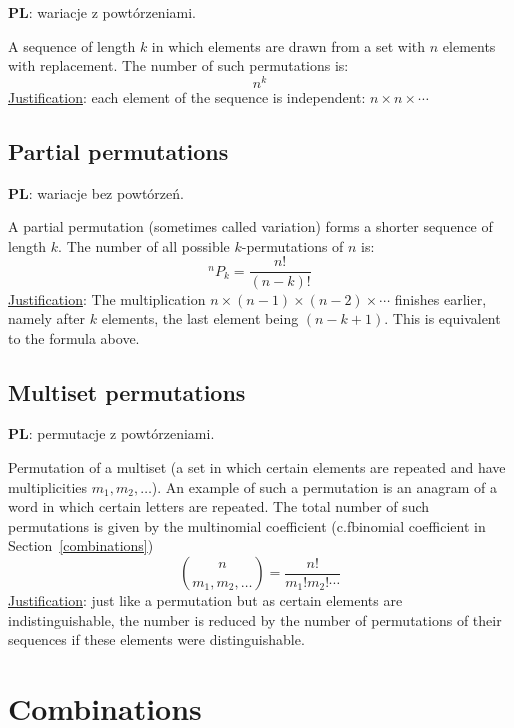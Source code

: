 \documentclass{article}
\makeatletter
\newcommand*{\cf}{c.f\@ifnextchar{.}{}{.\@\xspace}}
\newcommand{\pl}{\textbf{PL}: }
\makeatother
\begin{document}
\foreignlanguage{polish}{\pl wariacje z powtórzeniami.}

A sequence of length $k$ in which elements are drawn from a set with $n$ elements with replacement.
The number of such permutations is:
\begin{equation}
    n^k
\end{equation}
\underline{Justification}: each element of the sequence is independent: $n\times n\times \dotsb$

\subsection{Partial permutations}

\foreignlanguage{polish}{\pl wariacje bez powtórzeń.}

A partial permutation (sometimes called variation) forms a shorter sequence of length $k$. 
The number of all possible $k$\nobreakdash-\hspace{0pt}permutations of $n$ is:
\begin{equation}
    ^nP_k = \frac{n!}{(n-k)!}
\end{equation}
\underline{Justification}: The multiplication ${n\times(n-1)\times(n-2)\times \dotsb}$  finishes earlier, namely after $k$ elements, the last element being $(n-k+1)$.
This is equivalent to the formula above.

\subsection{Multiset permutations}
\label{mulper}

\foreignlanguage{polish}{\pl permutacje z powtórzeniami.}

Permutation of a multiset (a set in which certain elements are repeated and have multiplicities $m_1, m_2, \dotsc$).
An example of such a permutation is an anagram of a word in which certain letters are repeated.
The total number of such permutations is given by the multinomial coefficient (\cf binomial coefficient in Section~\ref{combinations})
\begin{equation}
    \binom{n}{m_1, m_2, \dotsc} = \frac{n!}{m_1!m_2!\dotsm}
\end{equation}
\underline{Justification}: just like a permutation but as certain elements are indistinguishable, the number is reduced by the number of permutations of their sequences if these elements were distinguishable.

\section{Combinations}
\end{document}
